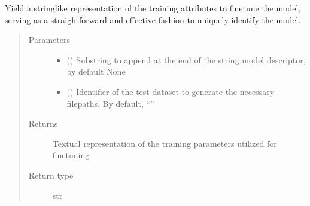 \documentclass[letterpaper,10pt,english]{sphinxmanual}
\begin{document}
\begin{fulllineitems}
\begin{fulllineitems}
\end{fulllineitems}


\begin{fulllineitems}
\label{\detokenize{code:gpt2_summarizer_inference.InferenceGPT2Summarizer.attrs_to_str}}
\sphinxAtStartPar
Yield a string\sphinxhyphen{}like representation of the training attributes to fine\sphinxhyphen{}tune the model,
serving as a straightforward and effective fashion to uniquely identify the model.
\begin{quote}\begin{description}
\item[{Parameters}] \leavevmode\begin{itemize}
\item {} 
\sphinxAtStartPar
{} (\sphinxstyleliteralemphasis{\sphinxupquote{, }}) \textendash{} Substring to append at the end of the string model descriptor, by default None

\item {} 
\sphinxAtStartPar
{} () \textendash{} Identifier of the test dataset to generate the necessary filepaths. By default, “”

\end{itemize}

\item[{Returns}] \leavevmode
\sphinxAtStartPar
Textual representation of the training parameters utilized for fine\sphinxhyphen{}tuning

\item[{Return type}] \leavevmode
\sphinxAtStartPar
str

\end{description}\end{quote}

\end{fulllineitems}


\end{fulllineitems}
\end{document}
